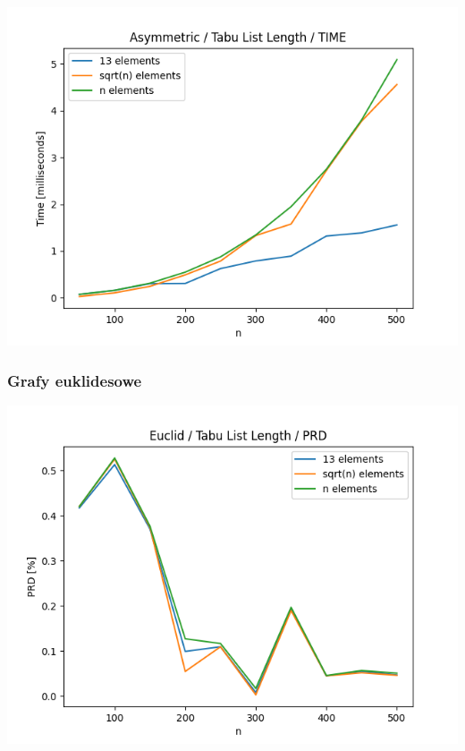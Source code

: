 \documentclass{article}
\begin{document}
\begin{center}
\includegraphics[width=\textwidth, 
                   height = 0.4\textheight, 
                   keepaspectratio]
                  {plots/tabu_asymmetric_time} 
\end{center}

\subsubsection{Grafy euklidesowe}

\begin{center}
\includegraphics[width=\textwidth, 
                   height = 0.4\textheight, 
                   keepaspectratio]
                  {plots/tabu_euclid_prd} 
\end{center}
\end{document}

